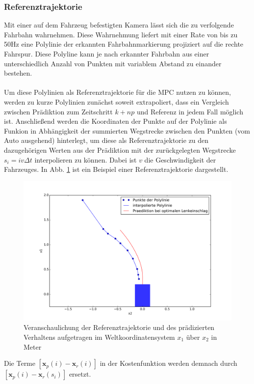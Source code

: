 \subsubsection{Referenztrajektorie}
Mit einer auf dem Fahrzeug befestigten Kamera lässt sich die zu verfolgende Fahrbahn wahrnehmen. Diese Wahrnehmung liefert mit einer Rate von bis zu 50Hz eine Polylinie der erkannten Fahrbahnmarkierung projiziert auf die rechte Fahrspur. Diese Polyline kann je nach erkannter Fahrbahn aus einer unterschiedlich Anzahl von Punkten mit variablem Abstand zu einander bestehen.\\ \\
Um diese Polylinien als Referenztrajektorie für die MPC nutzen zu können, werden zu kurze Polylinien zunächst soweit extrapoliert, dass ein Vergleich zwischen Prädiktion zum Zeitschritt $k+np$ und Referenz in jedem Fall möglich ist. Anschließend werden die Koordinaten der Punkte auf der Polylinie als Funkion in Abhängigkeit der summierten Wegstrecke zwischen den Punkten (vom Auto ausgehend) hinterlegt, um diese als Referenztrajektorie zu den dazugehörigen Werten aus der Prädiktion mit der zurückgelegten Wegstrecke $s_i = iv\Delta t$ interpolieren zu können. Dabei ist $v$ die Geschwindigkeit der Fahrzeuges. In Abb. \ref{fig:referenz} ist ein Beispiel einer Referenztrajektorie dargestellt.
\begin{figure}[t]
\centering
\includegraphics[scale=0.53]{Bilder/Reference.png}
\caption{Veranschaulichung der Referenztrajektorie und des prädizierten Verhaltens aufgetragen im Weltkoordinatensystem $x_1$ über $x_2$ in Meter}
\label{fig:referenz}
\end{figure}
Die Terme $\left [\boldsymbol{x}_{p}(i)-\boldsymbol{x}_{r}(i)\right ]$ in der Kostenfunktion werden demnach durch $\left [\boldsymbol{x}_{p}(i)-\boldsymbol{x}_{r}(s_i)\right ]$ ersetzt.\\ \\
